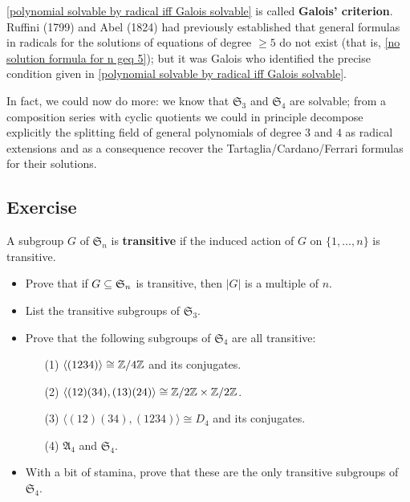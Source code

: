 \cref{polynomial solvable by radical iff Galois solvable} is called \textbf{Galois' criterion}. Ruffini (1799) and Abel (1824) had previously established that general formulas in radicals for the solutions of equations of degree $\geq 5$ do not exist (that is, \cref{no solution formula for n geq 5}); but it was Galois who identified the precise condition given in \cref{polynomial solvable by radical iff Galois solvable}.\par
In fact, we could now do more: we know that $\mathfrak{S}_3$ and $\mathfrak{S}_4$ are solvable; from a composition series with cyclic quotients we could in principle decompose explicitly the splitting field of general polynomials of degree $3$ and $4$ as radical extensions and as a consequence recover the Tartaglia/Cardano/Ferrari formulas for their solutions.
\subsection{Exercise}
\begin{exercise}
A subgroup $G$ of $\mathfrak{S}_n$ is \textbf{transitive} if the induced action of $G$ on $\{1,\dots,n\}$
is transitive.
\begin{itemize}
\item Prove that if $G\subseteq\mathfrak{S}_n$ is transitive, then $|G|$ is a multiple of $n$.
\item List the transitive subgroups of $\mathfrak{S}_3$.
\item Prove that the following subgroups of $\mathfrak{S}_4$ are all transitive:
\begin{itemize}
\item[(1)]$\langle(1234)\rangle\cong\mathbb{Z}/4\mathbb{Z}$ and its conjugates.
\item[(2)]$\langle(12)(34),(13)(24)\rangle\cong\mathbb{Z}/2\mathbb{Z}\times\mathbb{Z}/2\mathbb{Z}$.
\item[(3)]$\langle(12)(34),(1234)\rangle\cong D_4$ and its conjugates.
\item[(4)]$\mathfrak{A}_4$ and $\mathfrak{S}_4$.
\end{itemize}
\item With a bit of stamina, prove that these are the only transitive subgroups of $\mathfrak{S}_4$.
\end{itemize}
\end{exercise}
